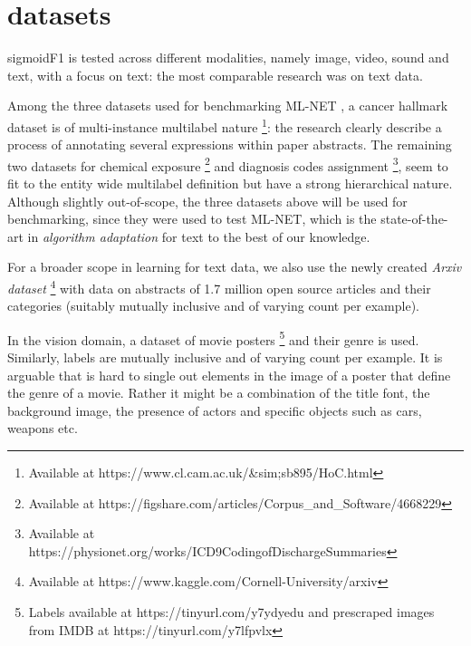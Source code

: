 \documentclass[sigconf,natbib,screen=true,review=true,anonymous]{acmart}
\newcommand\doubt[1]{\textcolor{orange}{DOUBT : #1}}
\begin{document}
\section{datasets}
\label{sec:org15557d2}

sigmoidF1 is tested across different modalities, namely image, video, sound and text, with a focus on text: the most comparable research was on text data.



Among the three datasets used for benchmarking ML-NET \cite{multitaskLabel}, a cancer hallmark dataset is of multi-instance multilabel nature \cite{cancerHallmarks} \footnote{Available at https://www.cl.cam.ac.uk/&sim;sb895/HoC.html}: the research clearly describe a process of annotating several expressions within paper abstracts. The remaining two datasets for chemical exposure \cite{chemExposure} \footnote{Available at https://figshare.com/articles/Corpus_and_Software/4668229} and diagnosis codes assignment \cite{diagnosisCode} \footnote{Available at https://physionet.org/works/ICD9CodingofDischargeSummaries}, seem to fit to the entity wide multilabel definition but have a strong hierarchical nature. Although slightly out-of-scope, the three datasets above will be used for benchmarking, since they were used to test ML-NET, which is the state-of-the-art in \emph{algorithm adaptation} for text to the best of our knowledge.

For a broader scope in learning for text data, we also use the newly created \emph{Arxiv dataset} \footnote{Available at https://www.kaggle.com/Cornell-University/arxiv} with data on abstracts of 1.7 million open source articles and their categories (suitably mutually inclusive and of varying count per example).

In the vision domain, a dataset of movie posters \footnote{Labels available at https://tinyurl.com/y7ydyedu and prescraped images from IMDB at https://tinyurl.com/y7lfpvlx} and their genre is used. Similarly, labels are mutually inclusive and of varying count per example. It is arguable that is hard to single out elements in the image of a poster that define the genre of a movie. Rather it might be a combination of the title font, the background image, the presence of actors and specific objects such as cars, weapons etc. 
\end{document}

